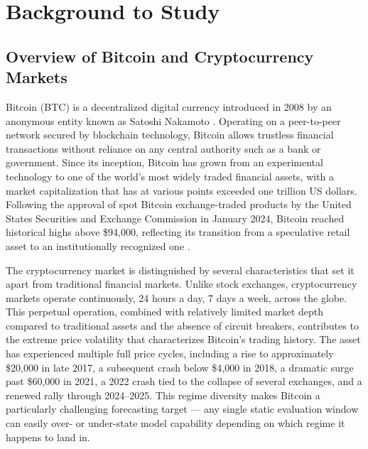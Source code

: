 \documentclass[12pt]{article}
\begin{document}
\tableofcontents
\newpage

\section{Background to Study}

\subsection{Overview of Bitcoin and Cryptocurrency Markets}

Bitcoin (BTC) is a decentralized digital currency introduced in 2008 by an anonymous entity known as Satoshi Nakamoto \cite{nakamoto2008}. Operating on a peer-to-peer network secured by blockchain technology, Bitcoin allows trustless financial transactions without reliance on any central authority such as a bank or government. Since its inception, Bitcoin has grown from an experimental technology to one of the world's most widely traded financial assets, with a market capitalization that has at various points exceeded one trillion US dollars. Following the approval of spot Bitcoin exchange-traded products by the United States Securities and Exchange Commission in January 2024, Bitcoin reached historical highs above \$94{,}000, reflecting its transition from a speculative retail asset to an institutionally recognized one \cite{wu2025cfa}.

The cryptocurrency market is distinguished by several characteristics that set it apart from traditional financial markets. Unlike stock exchanges, cryptocurrency markets operate continuously, 24 hours a day, 7 days a week, across the globe. This perpetual operation, combined with relatively limited market depth compared to traditional assets and the absence of circuit breakers, contributes to the extreme price volatility that characterizes Bitcoin's trading history. The asset has experienced multiple full price cycles, including a rise to approximately \$20{,}000 in late 2017, a subsequent crash below \$4{,}000 in 2018, a dramatic surge past \$60{,}000 in 2021, a 2022 crash tied to the collapse of several exchanges, and a renewed rally through 2024--2025. This regime diversity makes Bitcoin a particularly challenging forecasting target --- any single static evaluation window can easily over- or under-state model capability depending on which regime it happens to land in.
\end{document}
